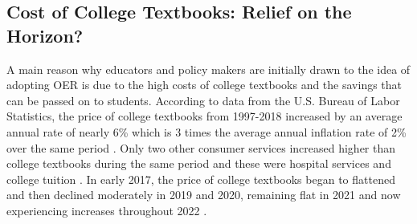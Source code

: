 \documentclass[11pt]{article}
\newcommand{\alink}[2]{\href{#1}{\textcolor{blue}{#2}}}
\begin{document}
\subsection{Cost of College Textbooks: Relief on the Horizon?}
A main reason why educators and policy makers are initially drawn to the idea of adopting OER is due to the high costs of college textbooks and the savings that can be passed on to students.  According to data from the U.S. Bureau of Labor Statistics, the price of college textbooks from 1997-2018 increased by an average annual rate of nearly 6\% which is 3 times the average annual inflation rate of 2\% over the same period \cite{bls}. Only two other consumer services increased higher than college textbooks during the same period and these were hospital services and college tuition \cite{perry2018}. %
In early 2017, the price of college textbooks began to flattened and then declined moderately in 2019 and 2020, remaining flat in 2021 and now experiencing increases throughout 2022 \cite{bls,perry2022}.
\end{document}
